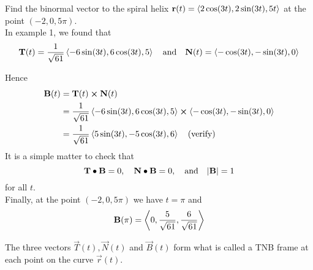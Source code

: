 \documentclass[handout]{ximera}
\begin{document}
\begin{example}[Example 2]
Find the binormal vector to the spiral helix $\mathbf r(t) =  \left\langle 2\cos(3t), 2\sin(3t), 5t\right\rangle$ at the point $(-2, 0, 5\pi)$.\\
In example 1, we found that
\[
\mathbf T(t) = \frac{1}{\sqrt{61}} \left\langle -6 \sin(3t), 6\cos(3t), 5\right\rangle \quad \text{and} \quad \mathbf N(t) = \left\langle -\cos(3t), -\sin(3t), 0\right\rangle
\]

Hence
\begin{align*}
\mathbf B(t) &= \mathbf T(t) \boldsymbol\times \mathbf N(t)\\
          &= \frac{1}{\sqrt{61}} \left\langle -6 \sin(3t), 6\cos(3t), 5\right\rangle \boldsymbol\times \left\langle -\cos(3t), -\sin(3t), 0\right\rangle\\
          &= \frac{1}{\sqrt{61}} \left\langle 5 \sin(3t), -5 \cos(3t), 6\right\rangle \quad \text{(verify)}
\end{align*}
It is a simple matter to check that 
\[
\mathbf T \bullet \mathbf B = 0, \quad \mathbf N \bullet \mathbf B = 0, \quad \text{and} \quad |\mathbf B| = 1
\]
for all $t$.\\
Finally, at the point $(-2, 0, 5\pi)$ we have $t = \pi$ and
\[
\mathbf B(\pi) = \left\langle 0, \frac{5}{\sqrt {61}}, \frac{6}{\sqrt{61}}\right\rangle
\]
\end{example}

The three vectors $\vec T(t), \vec N(t)$ and $\vec B(t)$ form what is called a TNB frame at each point on the curve $\vec r(t)$.
\end{document}
